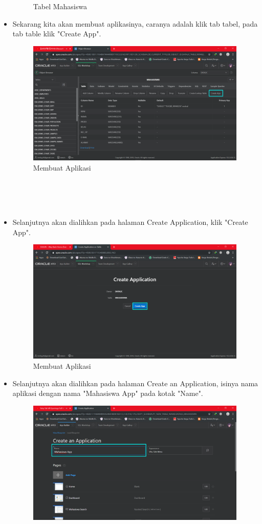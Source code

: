 \documentclass[12pt, times new roman]{article}
\begin{document}
\begin{itemize}
\begin{figure}[htbp]
	\caption{Tabel Mahasiswa}
\end{figure}
\item Sekarang kita akan membuat aplikasinya, caranya adalah klik tab tabel, pada tab table klik "Create App".
\begin{figure}[htbp]
	\centering
	\includegraphics[width=10.5cm]{figures/22.png}
	\caption{Membuat Aplikasi}
\end{figure}\\
\\
\\
\item Selanjutnya akan dialihkan pada halaman Create Application, klik "Create App".
\begin{figure}[htbp]
	\centering
	\includegraphics[width=10.5cm]{figures/23.png}
	\caption{Membuat Aplikasi}
\end{figure}
\item Selanjutnya akan dialihkan pada halaman Create an Application, isinya nama aplikasi dengan nama "Mahasiswa App" pada kotak "Name".
\begin{figure}[htbp]
	\centering
	\includegraphics[width=10.5cm]{figures/24.png}

\end{figure}
\end{itemize}
\end{document}
